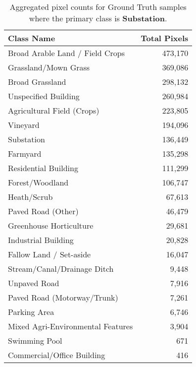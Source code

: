 \begin{table}[H] %
    \centering
    \caption{Aggregated pixel counts for Ground Truth samples where the primary class is \textbf{Substation}.}
    \label{tab:gt_counts_29}
    \begin{tabular}{lr}
        \hline
        \textbf{Class Name} & \textbf{Total Pixels} \\
        \hline
        Broad Arable Land / Field Crops & 473,170 \\
        Grassland/Mown Grass & 369,086 \\
        Broad Grassland & 298,132 \\
        Unspecified Building & 260,984 \\
        Agricultural Field (Crops) & 223,805 \\
        Vineyard & 194,096 \\
        Substation & 136,449 \\
        Farmyard & 135,298 \\
        Residential Building & 111,299 \\
        Forest/Woodland & 106,747 \\
        Heath/Scrub & 67,613 \\
        Paved Road (Other) & 46,479 \\
        Greenhouse Horticulture & 29,681 \\
        Industrial Building & 20,828 \\
        Fallow Land / Set-aside & 16,047 \\
        Stream/Canal/Drainage Ditch & 9,448 \\
        Unpaved Road & 7,916 \\
        Paved Road (Motorway/Trunk) & 7,261 \\
        Parking Area & 6,746 \\
        Mixed Agri-Environmental Features & 3,904 \\
        Swimming Pool & 671 \\
        Commercial/Office Building & 416 \\
        \hline
    \end{tabular}
\end{table}

